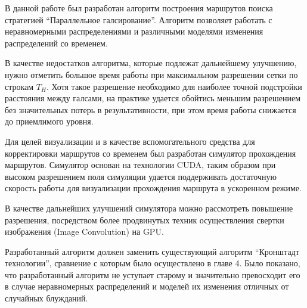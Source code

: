\startconclusionpage

В данной работе был разработан алгоритм построения маршрутов поиска стратегией
``Параллельное галсирование''. Алгоритм позволяет работать с неравномерными
распределениями и различными моделями изменения распределений со временем.

В качестве недостатков алгоритма, которые подлежат дальнейшему улучшению,
нужно отметить большое время работы при максимальном разрешении сетки
по строкам $T_H$. Хотя такое разрешение необходимо для наиболее точной
подстройки расстояния между галсами, на практике удается
обойтись меньшим разрешением без значительных потерь в результативности, при
этом время работы снижается до приемлимого уровня.

Для целей визуализации и в качестве вспомогательного средства для корректировки
маршрутов со временем был разработан симулятор прохождения маршрутов.
Симулятор основан на технологии CUDA, таким образом при высоком разрешением
поля симуляции удается поддерживать достаточную скорость работы для
визуализации прохождения маршрута в ускоренном режиме.

В качестве дальнейших улучшений симулятора можно рассмотреть повышение
разрешения, посредством более продвинутых техник осуществления свертки
изображения (Image Convolution) на GPU.

Разработанный алгоритм должен заменить существующий алгоритм
``Кронштадт технологии'', сравнение с которым было осуществлено
в главе 4. Было показано, что разработанный алгоритм не уступает старому и
значительно превосходит его в случае неравномерных распределений и
моделей их изменения отличных от случайных блужданий. 

\FloatBarrier
